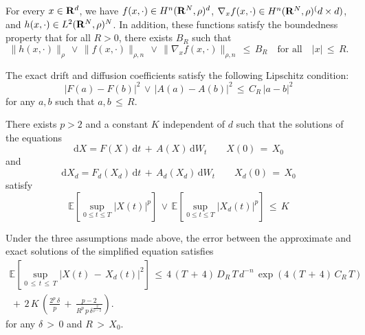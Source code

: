 \begin{assumption}
    For every $x \in \mathbf R^d$, we have $f(x,\cdot)\in H^n(\mathbf R^N, \rho)^d$, $\nabla_x f(x,\cdot) \in H^n(\mathbf R^N, \rho)^(d\times d)$, and $h(x,\cdot) \in L^2(\mathbf R^N, \rho)^N$. In addition, these functions satisfy the 
    boundedness property that for all $R>0$, there exists $B_R$ such that
    $$
    \|h(x,\cdot)\|_{\rho}\,{\vee}\,
    \|f(x,\cdot)\|_{{\rho},n}\,{\vee}\,\|\nabla_x f(x,\cdot)\|_{{\rho},n}
    \,{\leq}\, B_R \quad \text{for all} \quad |x| \,{\leq}\,R.
    $$
\end{assumption}
\begin{assumption}
    The exact drift and diffusion coefficients satisfy the following
    Lipschitz condition:
    $$ 
    \left|F(a)-F(b)\right|^2\,{\vee}\,\left|A(a)-A(b)\right|^2\, {\leq} \,C_R\, |a-b|^2
    $$
    for any $a,b$ such that $a,b\, {\leq} \,R$.
    \label{assumption Lipshitz}
\end{assumption}
\begin{assumption}
    There exists $p>2$ and a constant $K$ independent of $d$ such that the solutions of the equations 
    $$
    \mathrm dX=F(X)\,\mathrm dt\,+\,A(X)\,\mathrm dW_t \quad \quad X(0) \,=\,X_0
    $$
    and 
    $$
    \mathrm dX_d=F_d(X_d)\,\mathrm dt\,+\,A_d(X_d)\,\mathrm dW_t  \quad \quad X_d(0) \,=\,X_0 
    $$
    satisfy
    $$
    \mathbb E\left[\sup_{0 {\leq} t  {\leq} T} |X(t)|^p\right]\,{\vee}\,\mathbb
    E\left[\sup_{0 {\leq} t  {\leq} T} |X_d(t)|^p\right] \, {\leq} \,K
    $$
    \label{assumption: bounded moments}
\end{assumption} 
\begin{theorem}
    Under the three assumptions made above, the error between the approximate
    and exact solutions of the simplified equation satisfies
    \begin{multline*}
        \mathbb E \left[\sup_{0\, {\leq} \,t\, {\leq} \,T} |X(t) \,-\,X_d(t)|^2 \right]
        \, {\leq} \,4\,(T\,+\,4)\,D_R\,T\,d^{-n}\,\exp \left(4\,(T\,+\,4)\,C_R\, T\right)
        \\ \,+\, 2\,K\,
        \left(\frac{2^p\,{\delta}}{p}\,+\,\frac{p-2}{R^p\,p\,{\delta}^{\frac{2}{p-2}}}\right).
    \end{multline*}
    for any ${\delta}\,>\,0$ and $R\,>\,X_0$.
    \label{theorem: main converging coeff}
\end{theorem}
